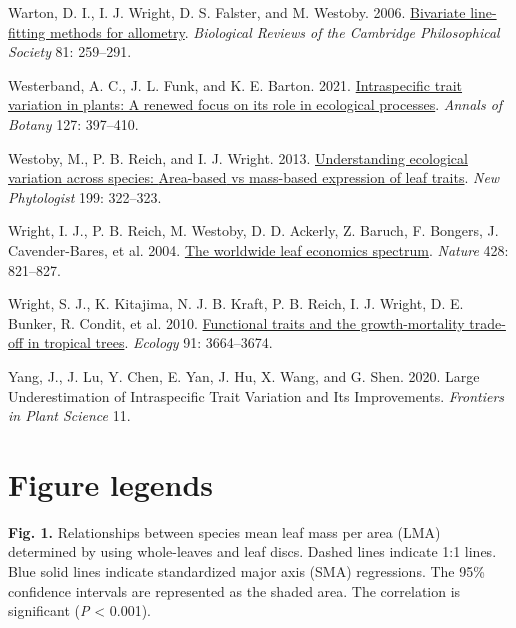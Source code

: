 \documentclass[
  12pt,
  a4paper,
,tablecaptionabove
]{scrartcl}
\newlength{\cslhangindent}
\newenvironment{CSLReferences}[2] %
 {%
  \setlength{\parindent}{0pt}
  \ifodd #1 \everypar{\setlength{\hangindent}{\cslhangindent}}\ignorespaces\fi
  \ifnum #2 > 0
  \setlength{\parskip}{#2\baselineskip}
  \fi
 }%
 {}
\begin{document}
\begin{CSLReferences}{1}{0}
\leavevmode{}%
Warton, D. I., I. J. Wright, D. S. Falster, and M. Westoby. 2006. \href{https://doi.org/10.1017/S1464793106007007}{Bivariate line-fitting methods for allometry}. \emph{Biological Reviews of the Cambridge Philosophical Society} 81: 259--291.

\leavevmode{}%
Westerband, A. C., J. L. Funk, and K. E. Barton. 2021. \href{https://doi.org/10.1093/aob/mcab011}{Intraspecific trait variation in plants: A renewed focus on its role in ecological processes}. \emph{Annals of Botany} 127: 397--410.

\leavevmode{}%
Westoby, M., P. B. Reich, and I. J. Wright. 2013. \href{https://doi.org/10.1111/nph.12345}{Understanding ecological variation across species: {Area-based} vs mass-based expression of leaf traits}. \emph{New Phytologist} 199: 322--323.

\leavevmode{}%
Wright, I. J., P. B. Reich, M. Westoby, D. D. Ackerly, Z. Baruch, F. Bongers, J. Cavender-Bares, et al. 2004. \href{https://doi.org/10.1038/nature02403}{The worldwide leaf economics spectrum}. \emph{Nature} 428: 821--827.

\leavevmode{}%
Wright, S. J., K. Kitajima, N. J. B. Kraft, P. B. Reich, I. J. Wright, D. E. Bunker, R. Condit, et al. 2010. \href{https://doi.org/10.1890/09-2335.1}{Functional traits and the growth-mortality trade-off in tropical trees}. \emph{Ecology} 91: 3664--3674.

\leavevmode{}%
Yang, J., J. Lu, Y. Chen, E. Yan, J. Hu, X. Wang, and G. Shen. 2020. Large {Underestimation} of {Intraspecific Trait Variation} and {Its Improvements}. \emph{Frontiers in Plant Science} 11.

\end{CSLReferences}

\newpage

\newpage

\hypertarget{figure-legends}{%
\section{Figure legends}\label{figure-legends}}

\textbf{Fig. 1.}
Relationships between species mean leaf mass per area (LMA) determined by using whole-leaves and leaf discs.
Dashed lines indicate 1:1 lines.
Blue solid lines indicate standardized major axis (SMA) regressions.
The 95\% confidence intervals are represented as the shaded area.
The correlation is significant (\emph{P} \textless{} 0.001).
\end{document}
